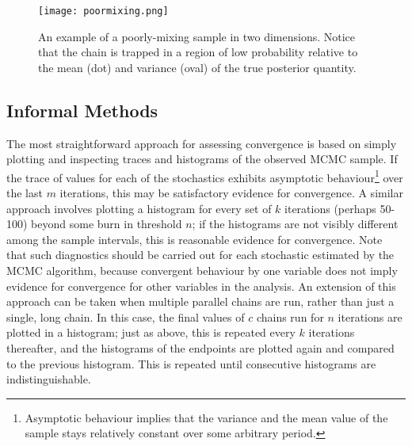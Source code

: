 \begin{figure}[ht]
\begin{center}
\texttt{[image: poormixing.png]}
\caption{An example of a poorly-mixing sample in two dimensions. Notice that the chain is trapped in a region of low probability relative to the mean (dot) and variance (oval) of the true posterior quantity.}
\label{fig:mix}
\end{center}
\end{figure}

\subsection{Informal Methods}

The most straightforward approach for assessing convergence is based on
simply plotting and inspecting traces and histograms of the observed MCMC
sample. If the trace of values for each of the stochastics exhibits asymptotic
behaviour\footnote{Asymptotic behaviour implies that the variance and the
mean value of the sample stays relatively constant over some arbitrary
period.} over the last $m$ iterations, this may be satisfactory evidence
for convergence. A similar approach involves plotting a histogram for every
set of $k$ iterations (perhaps 50-100) beyond some burn in threshold $n$;
if the histograms are not visibly different among the sample intervals,
this is reasonable evidence for convergence. Note that such diagnostics
should be carried out for each stochastic estimated by the MCMC algorithm,
because convergent behaviour by one variable does not imply evidence for
convergence for other variables in the analysis. An extension of this approach
can be taken when multiple parallel chains are run, rather than just a
single, long chain. In this case, the final values of $c$ chains run for
$n$ iterations are plotted in a histogram; just as above, this is repeated
every $k$ iterations thereafter, and the histograms of the endpoints are
plotted again and compared to the previous histogram. This is repeated
until consecutive histograms are indistinguishable.

